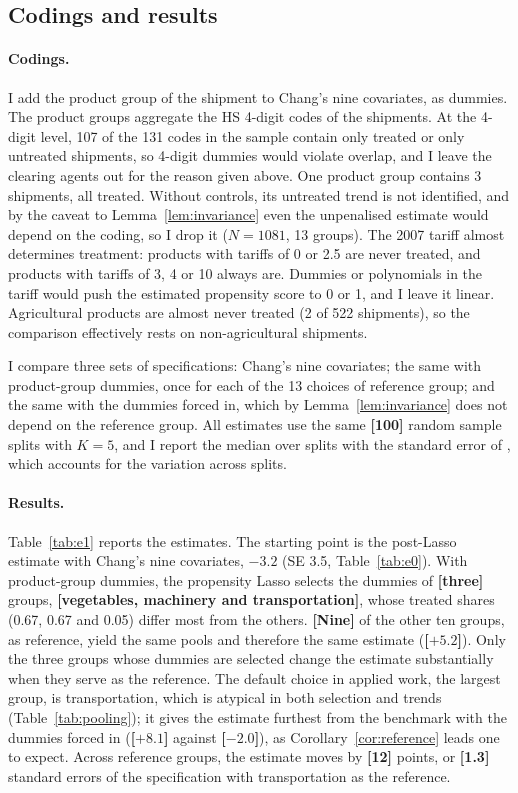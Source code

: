 \documentclass[11pt]{article}
\newcommand{\ph}[1]{\textcolor{orange!85!black}{\textbf{[#1]}}}
\newcommand{\where}[1]{\par\medskip\noindent{\small\textcolor{black!60}{\textsf{\textbf{Where:} #1}}}\par\nopagebreak\smallskip}
\newenvironment{ins}{\begin{leftbar}}{\end{leftbar}}
\theoremstyle{plain}
\theoremstyle{remark}
\begin{document}
\subsection{Codings and results}\label{sec:emp-b}
\where{After the previous insert.}
\begin{ins}
\paragraph{Codings.} I add the product group of the shipment to Chang's nine
covariates, as dummies. The product groups aggregate the HS 4-digit codes of the
shipments. At the 4-digit level, 107 of the 131 codes in the sample contain only
treated or only untreated shipments, so 4-digit dummies would violate overlap,
and I leave the clearing agents out for the reason given above. One product
group contains 3 shipments, all treated. Without controls, its untreated trend
is not identified, and by the caveat to Lemma~\ref{lem:invariance} even the
unpenalised estimate would depend on the coding, so I drop it ($N=1081$,
13 groups). The 2007 tariff almost determines treatment: products with tariffs
of 0 or 2.5 are never treated, and products with tariffs of 3, 4 or 10 always
are. Dummies or polynomials in the tariff would push the estimated propensity
score to 0 or 1, and I leave it linear. Agricultural products are almost never
treated (2 of 522 shipments), so the comparison effectively rests on
non-agricultural shipments.

I compare three sets of specifications: Chang's nine covariates; the same with
product-group dummies, once for each of the 13 choices of reference group; and
the same with the dummies forced in, which by Lemma~\ref{lem:invariance} does
not depend on the reference group. All estimates use the same \ph{100} random
sample splits with $K=5$, and I report the median over splits with the standard
error of \textcite[Section~3.4]{chernozhukov2018double}, which accounts for the
variation across splits.

\paragraph{Results.} Table~\ref{tab:e1} reports the estimates. The starting point is
the post-Lasso estimate with Chang's nine covariates, $-3.2$ (SE 3.5,
Table~\ref{tab:e0}). With product-group dummies, the
propensity Lasso selects the dummies of \ph{three} groups, \ph{vegetables,
machinery and transportation}, whose treated shares (0.67, 0.67 and 0.05) differ
most from the others. \ph{Nine} of the other ten groups, as reference, yield the
same pools and therefore the same estimate (\ph{$+5.2$}). Only the three groups
whose dummies are selected change the estimate substantially when they serve as
the reference. The default choice in applied work, the largest group, is
transportation, which is atypical in both selection and trends
(Table~\ref{tab:pooling}); it gives the estimate furthest from the benchmark
with the dummies forced in (\ph{$+8.1$} against \ph{$-2.0$}), as
Corollary~\ref{cor:reference} leads one to expect. Across reference groups, the
estimate moves by \ph{12} points, or \ph{1.3} standard errors of the specification
with transportation as the reference.


\end{ins}
\end{document}

